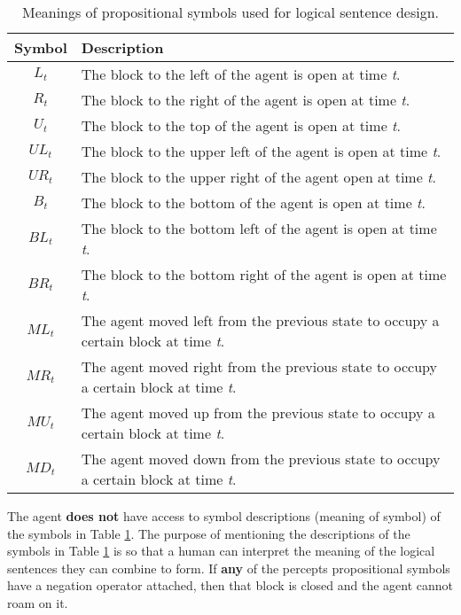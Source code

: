 \begin{table}[H]
  \begin{center}
    
    \begin{tabular}{c|l}
    
      \textbf{Symbol} & \textbf{Description} \\ 
      \hline
      $L_t$ & The block to the left of the agent is open at time \textit{t}. \\ 
      $R_t$ & The block to the right of the agent is open at time \textit{t}. \\  
      $U_t$ & The block to the top of the agent is open at time \textit{t}. \\   
      ${UL}_t$ & The block to the upper left of the agent is open at time \textit{t}. \\  
      ${UR}_t$ & The block to the upper right of the agent open at time \textit{t}. \\  
      $B_t$ & The block to the bottom of the agent is open at time \textit{t}. \\  
      ${BL}_t$ & The block to the bottom left of the agent is open at time \textit{t}. \\  
      ${BR}_t$ & The block to the bottom right of the agent is open at time \textit{t}. \\    
      ${ML}_t$ & The agent moved left from the previous state to occupy a certain block at time \textit{t}.\\ 
      ${MR}_t$ & The agent moved right from the previous state to occupy a certain block at time \textit{t}.\\ 
      ${MU}_t$ & The agent moved up from the previous state to occupy a certain block at time \textit{t}.\\  
      ${MD}_t$ & The agent moved down from the previous state to occupy a certain block at time \textit{t}.\\  
    \end{tabular}
  \end{center}
\caption{Meanings of propositional symbols used for logical sentence design.}
\label{table:symbol_description}

\end{table}

The agent \textbf{does not} have access to symbol descriptions (meaning of symbol) of the symbols in Table \ref{table:symbol_description}. The purpose of mentioning the descriptions of the symbols in Table \ref{table:symbol_description} is so that a human can interpret the meaning of the logical sentences they can combine to form. If \textbf{any} of the percepts propositional symbols have a negation operator attached, then that block is closed and the agent cannot roam on it.


